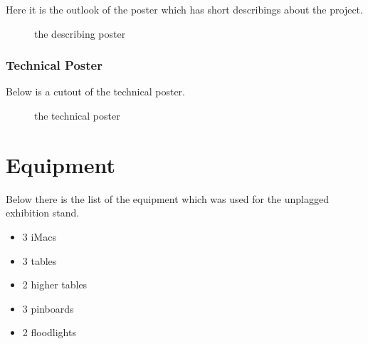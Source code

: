 Here it is the outlook of the poster which has short describings about the project.

\begin{figure}[!h]
  \centering
  \caption{the describing poster}
  \label{fig:poster_describing}
\end{figure}

\subsubsection{Technical Poster}

Below is a cutout of the technical poster.

\begin{figure}[!h]
  \centering
  \caption{the technical poster}
  \label{fig:poster_technical}
\end{figure}

\section{Equipment}
Below there is the list of the equipment which was used for the unplagged exhibition stand.

\begin{itemize}
\item 3 iMacs
\item 3 tables
\item 2 higher tables
\item 3 pinboards
\item 2 floodlights
\end{itemize}

